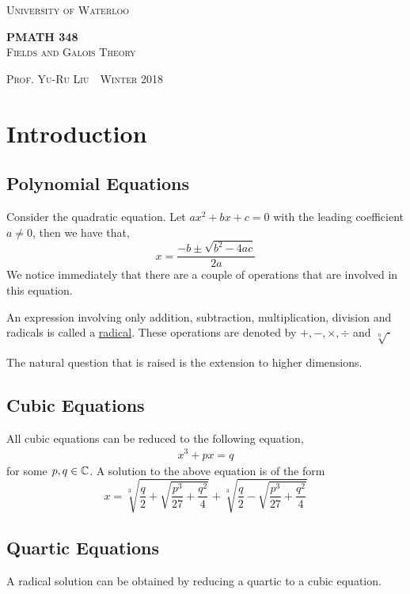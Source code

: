 \documentclass[11pt]{article}
\newcommand{\thiscoursecode}{PMATH 348}
\newcommand{\thiscoursename}{Fields and Galois Theory}
\newcommand{\thisprof}{Yu-Ru Liu}
\newcommand{\thisterm}{Winter 2018}
\begin{document}
\begin{titlepage}
\begin{centering}
{\scshape\LARGE University of Waterloo \par}
\globe
{\huge\bf \thiscoursecode}\\
{\scshape\Large \thiscoursename}\\
\vspace{.3cm}
{\scshape Prof. \thisprof~\textbullet~\thisterm\par}
\end{centering}
\sectionline
\tableofcontents
\sectionline
\thispagestyle{empty}
\end{titlepage}

\section{Introduction}
\subsection{Polynomial Equations}
Consider the quadratic equation. Let $ax^2 + bx + c = 0$ with the leading
coefficient $a \neq 0$, then we have that,
\begin{equation*}
x = \frac{-b \pm \sqrt{b^2 - 4ac}}{2a}
\end{equation*}
We notice immediately that there are a couple of operations that are involved in
this equation.
\begin{definition}
An expression involving only addition, subtraction, multiplication, division and
radicals is called a \underline{radical}. These operations are denoted by $+, -, \times,
\div$ and $\sqrt[n]{\cdot}$
\end{definition}
The natural question that is raised is the extension to higher dimensions.
\subsection{Cubic Equations}
All cubic equations can be reduced to the following equation,
\begin{align*}
x^3 + px = q
\end{align*}
for some $p, q \in \mathbb{C}$. A solution to the above equation is of the form
\begin{equation*}
x = \sqrt[3]{\frac{q}{2} + \sqrt{\frac{p^3}{27} + \frac{q^2}{4}}} +
\sqrt[3]{\frac{q}{2} - \sqrt{\frac{p^3}{27} + \frac{q^2}{4}}}\tag{Cardano's
Formula}
\end{equation*}
\subsection{Quartic Equations}
A radical solution can be obtained by reducing a quartic to a cubic equation.
\end{document}
